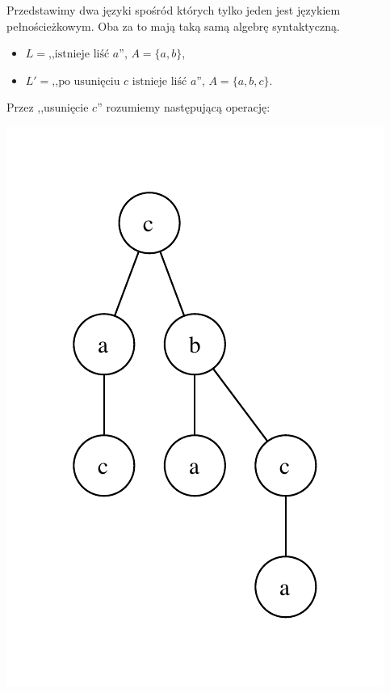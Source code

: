 \begin{przyklad}
	Przedstawimy dwa języki spośród których tylko jeden jest językiem pełnościeżkowym. Oba za to mają taką samą algebrę syntaktyczną.
	
	\begin{itemize}
		\item $L = \textrm{,,istnieje liść $a$''}$, $A = \{a,b\}$,
		\item $L' = \textrm{,,po usunięciu $c$ istnieje liść $a$''}$, $A = \{a,b,c\}$.
	\end{itemize}
	
	Przez ,,usunięcie $c$'' rozumiemy następującą operację:
	
	\begin{center}
		\begin{minipage}[t]{.25\linewidth}
			\vspace{0pt}
			\centering
			\includegraphics[scale=0.6]{rysunki/w12-usuniecie_c_1.pdf}

\end{minipage}
\end{center}
\end{przyklad}
